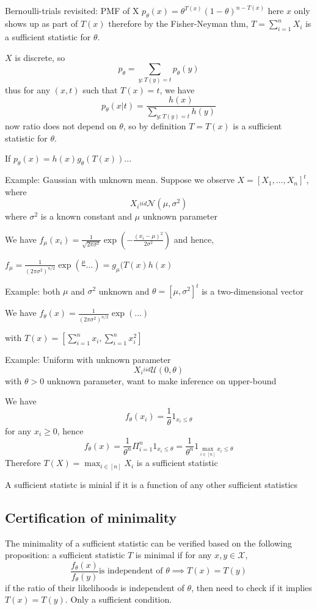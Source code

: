\documentclass[11pt, oneside]{book}
\theoremstyle{definition}
\begin{document}
Bernoulli-trials revisited: PMF of X $p_\theta(x) = \theta^{T(x)} (1 - \theta)^{n - T(x)}$
    here $x$ only shows up as part of $T(x)$
    therefore by the Fisher-Neyman thm, $T = \sum_{i=1}^n X_i$ is a sufficient statistic for $\theta$.

$X$ is discrete, so 
\[
    p_\theta = \sum_{y:T(y)=t} p_\theta(y)
\]
thus for any $(x, t)$ such that $T(x)=t$, we have
\[
    p_\theta(x | t) = \frac{h(x)}{\sum_{y:T(y)=t}h(y)}
\]
now ratio does not depend on $\theta$, so by definition $T=T(x)$ is a sufficient statistic for $\theta$.

If $p_\theta(x) = h(x) g_\theta(T(x))$...

Example: Gaussian with unknown mean. Suppose we observe $X = [X_1, \dots, X_n]^t$, where
\[
    X_i \overset{iid}{~} \mathcal{N}(\mu, \sigma^2)
\]
where $\sigma^2$ is a known constant and $\mu$ unknown parameter

We have $f_\mu(x_i) = \frac{1}{\sqrt{2 \pi \sigma^2}} \exp \left(- \frac{(x_i - \mu)^2}{2\sigma^2}\right)$ and hence,

$f_\mu = \frac{1}{(2\pi \sigma^2)^{n/2}} \exp \left( \frac{\mu}{}... \right) = g_\mu(T(x)h(x)$

Example: both $\mu$ and $\sigma^2$ unknown and $\theta = [\mu, \sigma^2]^t$ is a two-dimensional vector

    We have $f_\theta(x) = \frac{1}{(2\pi \sigma^2)^{n/2}} \exp \left( ... \right)$

    with $T(x) = [\sum_{i=1}^n x_i, \sum_{i=1}^n x_i^2]$

Example: Uniform with unknown parameter
\[
    X_i \overset{iid}{~} \mathcal{U}(0, \theta)
\]
with $\theta > 0$ unknown parameter, want to make inference on upper-bound

We have 
\[
    f_\theta(x_i) = \frac{1}{\theta} 1_{x_i \leq \theta}
\]
for any $x_i \geq 0$, hence
\[
    f_\theta(x) = \frac{1}{\theta^n} \Pi_{i=1}^n 1_{x_i \leq \theta} = \frac{1}{\theta^n}1_{\max_{i \in [n]} x_i \leq \theta}
\]
Therefore $T(X) = \max_{i \in [n]} X_i$ is a sufficient statistic

A sufficient statistc is minial if it is a function of any other sufficient statistics

\subsection{Certification of minimality}

The minimality of a sufficient statistic can be verified based on the following proposition: a sufficient statistic $T$ is minimal if for any $x, y \in \mathcal{X}$,
\[
    \frac{f_\theta(x)}{f_\theta(y)} \text{is independent of } \theta \implies T(x) = T(y)
\]
if the ratio of their likelihoods is independent of $\theta$, then need to check if it implies $T(x) = T(y)$. Only a sufficient condition.
\end{document}
